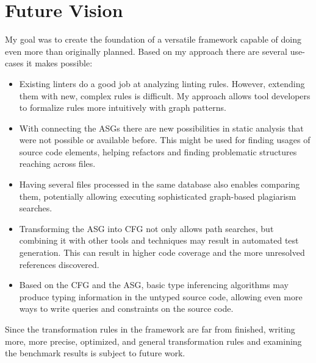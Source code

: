 \chapter{Future Vision}
\label{chap:future-vision}

My goal was to create the foundation of a versatile framework capable of doing even more than originally planned. Based on my approach there are several use-cases it makes possible:

\begin{itemize}[topsep=0pt]
  \item Existing linters do a good job at analyzing linting rules. However, extending them with new, complex rules is difficult. My approach allows tool developers to formalize rules more intuitively with graph patterns.

  \item With connecting the ASGs there are new possibilities in static analysis that were not possible or available before. This might be used for finding usages of source code elements, helping refactors and finding problematic structures reaching across files.

  \item Having several files processed in the same database also enables comparing them, potentially allowing executing sophisticated graph-based plagiarism searches.

  \item Transforming the ASG into CFG not only allows path searches, but combining it with other tools and techniques may result in automated test generation. This can result in higher code coverage and the more unresolved references discovered.

  \item Based on the CFG and the ASG, basic type inferencing algorithms may produce typing information in the untyped source code, allowing even more ways to write queries and constraints on the source code.
\end{itemize}

Since the transformation rules in the framework are far from finished, writing more, more precise, optimized, and general transformation rules and examining the benchmark results is subject to future work.
